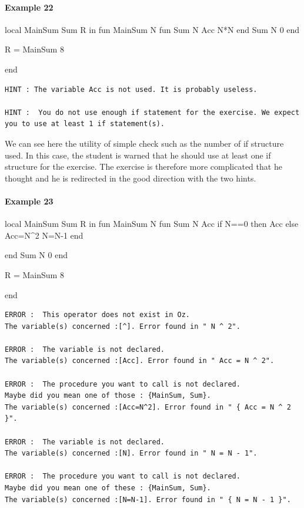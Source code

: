 \documentclass[11pt,a4paper,twoside,openright]{report}
\begin{document}
\paragraph{Example 22}
\begin{OZ}
local MainSum Sum R in
	fun {MainSum N}
		fun {Sum N Acc}
			N*N	
			end
    {Sum N 0}
	end

	R = {MainSum 8}

end

\end{OZ}


\begin{lstlisting}
HINT : The variable Acc is not used. It is probably useless.

HINT :  You do not use enough if statement for the exercise. We expect you to use at least 1 if statement(s).
\end{lstlisting}

We can see here the utility of simple check such as the number of if structure 
used. In this case, the student is warned that he should use at least one if 
structure for the exercise. The exercise is therefore more complicated that he 
thought and he is redirected in the good direction with the two hints.

\paragraph{Example 23}
\begin{OZ}
local MainSum Sum R in
	fun {MainSum N}
		fun {Sum N Acc}
			if N==0 then Acc
			else {Acc=N^2} {N=N-1} end

			end
    {Sum N 0}
	end

	R = {MainSum 8}

end

\end{OZ}


\begin{lstlisting}
ERROR :  This operator does not exist in Oz. 
The variable(s) concerned :[^]. Error found in " N ^ 2".

ERROR :  The variable is not declared. 
The variable(s) concerned :[Acc]. Error found in " Acc = N ^ 2".

ERROR :  The procedure you want to call is not declared. 
Maybe did you mean one of those : {MainSum, Sum}.
The variable(s) concerned :[Acc=N^2]. Error found in " { Acc = N ^ 2 }".

ERROR :  The variable is not declared. 
The variable(s) concerned :[N]. Error found in " N = N - 1".

ERROR :  The procedure you want to call is not declared. 
Maybe did you mean one of these : {MainSum, Sum}. 
The variable(s) concerned :[N=N-1]. Error found in " { N = N - 1 }".
\end{lstlisting}
\end{document}
